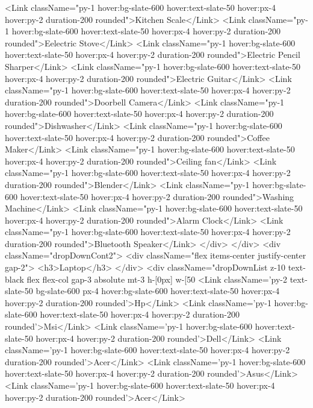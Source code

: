         <Link className="py-1 hover:bg-slate-600 hover:text-slate-50 hover:px-4 hover:py-2 duration-200 rounded">Kitchen Scale</Link>
        <Link className="py-1 hover:bg-slate-600 hover:text-slate-50 hover:px-4 hover:py-2 duration-200 rounded">Eelectric Stove</Link>
        <Link className="py-1 hover:bg-slate-600 hover:text-slate-50 hover:px-4 hover:py-2 duration-200 rounded">Electric Pencil Sharper</Link>
        <Link className="py-1 hover:bg-slate-600 hover:text-slate-50 hover:px-4 hover:py-2 duration-200 rounded">Electric Guitar</Link>
        <Link className="py-1 hover:bg-slate-600 hover:text-slate-50 hover:px-4 hover:py-2 duration-200 rounded">Doorbell Camera</Link>
        <Link className="py-1 hover:bg-slate-600 hover:text-slate-50 hover:px-4 hover:py-2 duration-200 rounded">Dishwasher</Link>
        <Link className="py-1 hover:bg-slate-600 hover:text-slate-50 hover:px-4 hover:py-2 duration-200 rounded">Coffee Maker</Link>
        <Link className="py-1 hover:bg-slate-600 hover:text-slate-50 hover:px-4 hover:py-2 duration-200 rounded">Ceiling fan</Link>
        <Link className="py-1 hover:bg-slate-600 hover:text-slate-50 hover:px-4 hover:py-2 duration-200 rounded">Blender</Link>
        <Link className="py-1 hover:bg-slate-600 hover:text-slate-50 hover:px-4 hover:py-2 duration-200 rounded">Washing Machine</Link>
        <Link className="py-1 hover:bg-slate-600 hover:text-slate-50 hover:px-4 hover:py-2 duration-200 rounded">Alarm Clock</Link>
        <Link className="py-1 hover:bg-slate-600 hover:text-slate-50 hover:px-4 hover:py-2 duration-200 rounded">Bluetooth Speaker</Link>
    </div>
</div>
<div className="dropDownCont2">
    <div className="flex items-center justify-center gap-2">
        <h3>Laptop</h3>
    </div>
    <div className="dropDownList z-10 text-black flex flex-col gap-3 absolute mt-3 h-[0px] w-[50%
        <Link className='py-2 text-slate-50 bg-slate-600 px-4 hover:bg-slate-600 hover:text-slate-50 hover:px-4 hover:py-2 duration-200 rounded'>Hp</Link>
        <Link className='py-1 hover:bg-slate-600 hover:text-slate-50 hover:px-4 hover:py-2 duration-200 rounded'>Msi</Link>
        <Link className='py-1 hover:bg-slate-600 hover:text-slate-50 hover:px-4 hover:py-2 duration-200 rounded'>Dell</Link>
        <Link className='py-1 hover:bg-slate-600 hover:text-slate-50 hover:px-4 hover:py-2 duration-200 rounded'>Acer</Link>
        <Link className='py-1 hover:bg-slate-600 hover:text-slate-50 hover:px-4 hover:py-2 duration-200 rounded'>Asus</Link>
        <Link className='py-1 hover:bg-slate-600 hover:text-slate-50 hover:px-4 hover:py-2 duration-200 rounded'>Acer</Link>
